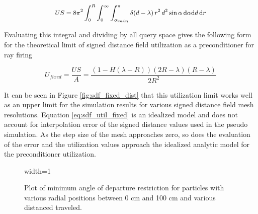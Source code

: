 \begin{equation}
\small US = 8\pi^2  \int_{0}^{R}\int_{0}^{\infty}\int_{\boldsymbol{\alpha_{min}}}^{\pi} \delta(d-\lambda) \,
r^2 \, d^2 \sin{\alpha} \, \mathrm{d}\alpha \mathrm{d}d \, \mathrm{d}r
\label{eq:subs_a_cond}
\end{equation}

Evaluating this integral and dividing by all query space gives the
following form for the theoretical limit of signed distance field utilization as a
preconditioner for ray firing

\begin{equation}
  U_{fixed} = \frac{US}{A} =  \frac{(1-H(\lambda-R))(2R-\lambda)(R-\lambda)}{2R^2}
  \label{eq:sdf_util_fixed}
\end{equation}

It can be seen in Figure \ref{fig:sdf_fixed_dist} that this utilization limit
works well as an upper limit for the simulation results for various signed
distance field mesh resolutions. Equation \eqref{eq:sdf_util_fixed} is an
idealized model and does not account for interpolation error of the signed
distance values used in the pseudo simulation. As the step size of the mesh
approaches zero, so does the evaluation of the error and the utilization values
approach the idealized analytic model for the preconditioner utilization.


\begin{figure}[H]
  \centering
  {width=1\textwidth}
  \caption[Plot of $\alpha_{min}$.]{Plot of minimum angle of departure
    restriction for particles with various radial positions between 0 cm and 100
    cm and various distanced traveled.}
 \label{fig:alpha_min}
\end{figure}


